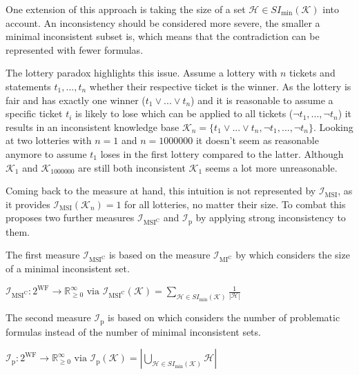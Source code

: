 One extension of this approach is taking the size of a set \(\mathcal{H} \in SI_{\min}(\mathcal{K})\) into account. An inconsistency should be considered more severe, the smaller a minimal inconsistent subset is, which means that the contradiction can be represented with fewer formulas.

The lottery paradox \cite{kyburg_probability_1961} highlights this issue.
Assume a lottery with \(n\) tickets and statements \(t_1, ..., t_n\) whether their respective ticket is the winner. As the lottery is fair and has exactly one winner (\(t_1 \lor ... \lor t_n\)) and it is reasonable to assume a specific ticket \(t_i\) is likely to lose which can be applied to all tickets (\(\neg t_1, ..., \neg t_n\)) it results in an inconsistent knowledge base \(\mathcal{K}_n = \{ t_1 \lor ... \lor t_n, \neg t_1, ..., \neg t_n \}\). Looking at two lotteries with \(n = 1\) and \(n = 1000000\) it doesn't seem as reasonable anymore to assume \(t_1\) loses in the first lottery compared to the latter. Although \(\mathcal{K}_1\) and \(\mathcal{K}_{1000000}\) are still both inconsistent \(\mathcal{K}_1\) seems a lot more unreasonable.

Coming back to the measure at hand, this intuition is not represented by \(\mathcal{I}_{\text{MSI}}\), as it provides \(\mathcal{I}_{\text{MSI}}(\mathcal{K}_n) = 1\) for all lotteries, no matter their size. To combat this \cite{ulbricht_handling_2020} proposes two further measures \(\mathcal{I}_{\text{MSI}^\text{C}}\) and \(\mathcal{I}_{\text{p}}\) by applying strong inconsistency to them.

The first measure \(\mathcal{I}_{\text{MSI}^\text{C}}\) is based on the measure \(\mathcal{I}_{\text{MI}^{\text{C}}}\) by \cite{hunter_measuring_2008} which considers the size of a minimal inconsistent set.

\begin{definition}
    \(\mathcal{I}_{\text{MSI}^\text{C}}: 2^{\text{WF}} \rightarrow \mathbb{R}_{\geq 0}^{\infty} \text{ via } \mathcal{I}_{\text{MSI}^\text{C}}(\mathcal{K}) = \sum\limits_{\mathcal{H} \in SI_{\min}(\mathcal{K})} \frac{1}{|\mathcal{H}|}\)
\end{definition}

The second measure \(\mathcal{I}_{\text{p}}\) is based on \cite{liu_measuring_2011} which considers the number of problematic formulas instead of the number of minimal inconsistent sets.

\begin{definition}
    \(\mathcal{I}_{\text{p}}: 2^{\text{WF}} \rightarrow \mathbb{R}_{\geq 0}^{\infty} \text{ via } \mathcal{I}_{\text{p}}(\mathcal{K}) = \left| \bigcup\limits_{\mathcal{H} \in SI_{\min}(\mathcal{K})} \mathcal{H} \right|\)
\end{definition}

